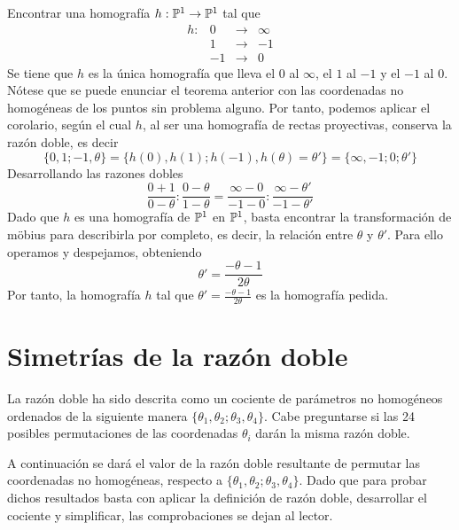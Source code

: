 \begin{exa}
	Encontrar una homografía $h:\mathbb{P}^1\rightarrow \mathbb{P}^1$ tal que 
	\begin{equation*}
		\begin{array}{cccc}
		h:&0&\rightarrow &\infty\\
		&1&\rightarrow &-1\\
		&-1&\rightarrow &0
		\end{array}
	\end{equation*}
	Se tiene que $h$ es la única homografía que lleva el $0$ al $\infty$, el $1$ al $-1$ y el $-1$ al $0$. Nótese que se puede enunciar el teorema anterior con las coordenadas no homogéneas de los puntos sin problema alguno. Por tanto, podemos aplicar el corolario, según el cual $h$, al ser una homografía de rectas proyectivas, conserva la razón doble, es decir
	\begin{equation*}
		\{0,1;-1,\theta\}=\{h(0),h(1);h(-1),h(\theta)=\theta'\}=\{\infty,-1;0;\theta'\}
	\end{equation*}
	Desarrollando las razones dobles
	\begin{equation*}
		\frac{0+1}{0-\theta}:\frac{0-\theta}{1-\theta}=\frac{\infty-0}{-1-0}:\frac{\infty-\theta'}{-1-\theta'}
	\end{equation*}
	Dado que $h$ es una homografía de $\mathbb{P}^1$ en $\mathbb{P}^1$, basta encontrar la transformación de möbius para describirla por completo, es decir, la relación entre $\theta$ y $\theta'$. Para ello operamos y despejamos, obteniendo
	\begin{equation*}
		\theta'=\frac{-\theta-1}{2\theta}
	\end{equation*}
	Por tanto, la homografía $h$ tal que $\theta'=\frac{-\theta-1}{2\theta}$ es la homografía pedida.
\end{exa}

\section{Simetrías de la razón doble}

La razón doble ha sido descrita como un cociente de parámetros no homogéneos ordenados de la siguiente manera $\{\theta_1,\theta_2;\theta_3,\theta_4\}$. Cabe preguntarse si las 24 posibles permutaciones de las coordenadas $\theta_i$ darán la misma razón doble.

A continuación se dará el valor de la razón doble resultante de permutar las coordenadas no homogéneas, respecto a $\{\theta_1,\theta_2;\theta_3,\theta_4\}$. Dado que para probar dichos resultados basta con aplicar la definición de razón doble, desarrollar el cociente y simplificar, las comprobaciones se dejan al lector. 

